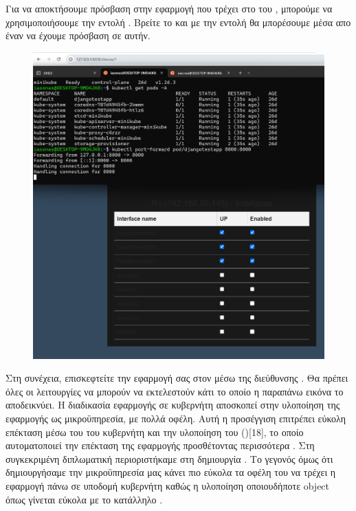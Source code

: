 Για να αποκτήσουμε πρόσβαση στην εφαρμογή  που τρέχει στο  του , 
μπορούμε να χρησιμοποιήσουμε την εντολή . Βρείτε το  και με την εντολή  θα μπορέσουμε μέσα απο έναν 
να έχουμε πρόσβαση σε αυτήν.

\FloatBarrier

\begin{figure}[h]
	\centering
	\includegraphics[width=1.5\textwidth]{graphics/kubernetes_proxy.png}
	\caption{}
\end{figure}

\FloatBarrier

\noindent  Στη συνέχεια, επισκεφτείτε την εφαρμογή σας στον  μέσω της διεύθυνσης . Θα πρέπει όλες οι λειτουργίες
να μπορούν να εκτελεστούν κάτι το οποίο η παραπάνω εικόνα το αποδεικνύει. Η διαδικασία εφαρμογής σε κυβερνήτη αποσκοπεί στην υλοποίηση της εφαρμογής ως μικροϋπηρεσία, με πολλά οφέλη. Αυτή η προσέγγιση επιτρέπει εύκολη επέκταση μέσω του  του κυβερνήτη και την υλοποίηση του  ()[18], το οποίο αυτοματοποιεί την επέκταση της εφαρμογής προσθέτοντας περισσότερα . Στη συγκεκριμένη διπλωματική περιοριστήκαμε στη δημιουργία . Το γεγονός όμως ότι δημιουργήσαμε την μικροϋπηρεσία  μας κάνει πιο εύκολα τα οφέλη  του να  τρέχει η εφαρμογή πάνω σε υποδομή κυβερνήτη καθώς η υλοποίηση οποιουδήποτε   object όπως   γίνεται εύκολα  με το κατάλληλο . 


